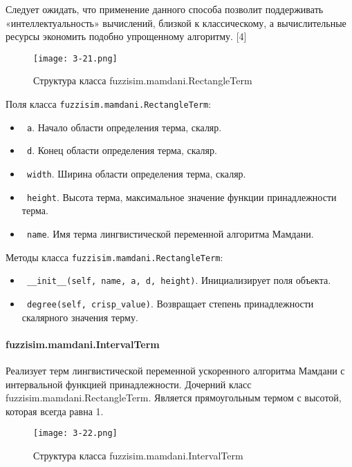 Следует ожидать, что применение данного способа позволит поддерживать  «интеллектуальность» вычислений, близкой к  классическому, а вычислительные ресурсы экономить подобно упрощенному алгоритму. [4]

\begin{figure}[ht]
	\centering
	\texttt{[image: 3-21.png]}
	\caption{ Структура класса fuzzisim.mamdani.RectangleTerm}
\end{figure}

Поля класса \lstinline!fuzzisim.mamdani.RectangleTerm!:
\begin{itemize}
	\item \lstinline! a!. Начало области определения терма, скаляр.
	\item \lstinline! d!. Конец области определения терма, скаляр.
	\item \lstinline! width!. Ширина области определения терма, скаляр.
	\item \lstinline! height!. Высота терма, максимальное значение функции принадлежности терма.
	\item \lstinline! name!. Имя терма лингвистической переменной алгоритма Мамдани.
\end{itemize}


Методы класса \lstinline!fuzzisim.mamdani.RectangleTerm!:
\begin{itemize}
	\item \lstinline! __init__(self, name, a, d, height)!. Инициализирует поля объекта.
	\item \lstinline! degree(self, crisp_value)!. Возвращает степень принадлежности скалярного значения терму.
\end{itemize}



\paragraph{fuzzisim.mamdani.IntervalTerm}

Реализует терм лингвистической переменной ускоренного алгоритма Мамдани с интервальной функцией принадлежности. Дочерний класс fuzzisim.mamdani.RectangleTerm. Является прямоугольным термом с высотой, которая всегда равна 1.

\begin{figure}[ht]
	\centering
	\texttt{[image: 3-22.png]}
	\caption{ Структура класса fuzzisim.mamdani.IntervalTerm}
\end{figure}



